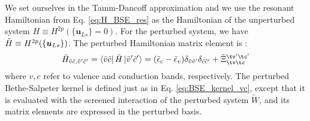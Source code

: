 We set ourselves in the Tamm-Dancoff approximation and we use the resonant Hamiltonian from Eq. \eqref{eq:H_BSE_res} as the  Hamiltonian of the unperturbed system $H \equiv H^{2p}(\{\boldsymbol{u}_{Ls} \}=0)$. For the perturbed system, we have $\Tilde{H} \equiv H^{2p}(\{\boldsymbol{u}_{Ls} \})$. 
The perturbed Hamiltonian matrix element is :
\begin{equation}
    \Tilde{H}_{\Tilde{v}\Tilde{c},\Tilde{v}'\Tilde{c}'}  = \bra{\Tilde{v}\Tilde{c}} \tilde{H} \ket{\Tilde{v}'\Tilde{c}'}  = ( \Tilde{\epsilon}_c - \Tilde{\epsilon}_v ) \delta_{\Tilde{v}\Tilde{v}'}\delta_{\Tilde{c}\Tilde{c}'} + \tilde{\Xi}_{\tv\tc}^{\tv'\tc'} \label{eq:perturbed_BSE}
\end{equation}
where $v,c$ refer to valence and conduction bands, respectively.
The perturbed Bethe-Salpeter kernel is defined just as in Eq. \eqref{eq:BSE_kernel_vc}, except that it is evaluated with the screened interaction of the perturbed system $\tilde{W}$, and its matrix elements are expressed in the perturbed basis.

